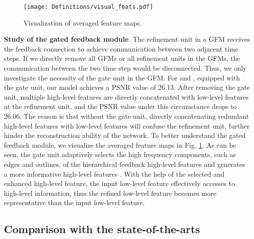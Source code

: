 \documentclass{bmvc2k}
\begin{document}
	
\begin{figure}[htbp]
	\centering
	{\texttt{[image: Definitions/visual\_feats.pdf]}} 
	\vspace{-5mm}
	\caption{Visualization of averaged feature maps.}
	\label{fig:feat}
	\vspace{-4mm}
\end{figure}
	
	\noindent \textbf{Study of the gated feedback module}. The refinement unit in a GFM receives the feedback connection to achieve communication between two adjacent time steps. If we directly remove all GFMs or all refinement units in the GFMs, the communication between the two time step would be disconnected. Thus, we only investigate the necessity of the gate unit in the GFM. For  and , equipped with the gate unit, our model achieves a PSNR value of 26.13. After removing the gate unit, multiple high-level features are directly concatenated with low-level features at the refinement unit, and the PSNR value under this circumstance drops to 26.06. The reason is that without the gate unit, directly concatenating redundant high-level features with low-level features will confuse the refinement unit, further hinder the reconstruction ability of the network. To better understand the gated feedback module, we visualize the averaged feature maps in Fig. \ref{fig:feat}. As can be seen, the gate unit adaptively selects the high frequency components, such as edges and outlines, of the hierarchical feedback high-level features and generates a more informative high-level features . With the help of the selected and enhanced high-level feature, the input low-level feature effectively accesses to high-level information, thus the refined low-level feature becomes more representative than the input low-level feature.


	\subsection{Comparison with the state-of-the-arts}

	\setlength{\parskip}{0\baselineskip}
	
\end{document}
